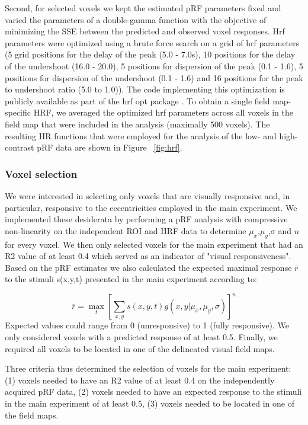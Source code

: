 Second, for selected voxels we kept the estimated pRF parameters fixed and varied the parameters of a double-gamma function with the objective of minimizing the SSE between the predicted and observed voxel responses. Hrf parameters were optimized using a brute force search on a grid of hrf parameters (5 grid positions for the delay of the peak (5.0 - 7.0s), 10 positions for the delay of the undershoot (16.0 - 20.0), 5 positions for dispersion of the peak (0.1 - 1.6), 5 positions for dispersion of the undershoot (0.1 - 1.6) and 16 positions for the peak to undershoot ratio (5.0 to 1.0)). The code implementing this optimization is publicly available as part of the hrf opt package \parencite{pyprf_motion}. To obtain a single field map-specific HRF, we averaged the optimized hrf parameters across all voxels in the field map that were included in the analysis (maximally 500 voxels). The resulting HR functions that were employed for the analysis of the low- and high-contrast pRF data are shown in Figure ~\ref{fig:hrf}.

\subsubsection{Voxel selection}
We were interested in selecting only voxels that are visually responsive and, in particular, responsive to the eccentricities employed in the main experiment. We implemented these desiderata by performing a pRF analysis with compressive non-linearity on the independent ROI and HRF data to determine $\mu_x$,$\mu_y$,$\sigma$ and $n$ for every voxel. We then only selected voxels for the main experiment that had an R2 value of at least 0.4 which served as an indicator of "visual responsiveness". Based on the pRF estimates we also calculated the expected maximal response $\overline{r}$ to the stimuli s(x,y,t) presented in the main experiment according to:

\begin{equation}
\overline{r} = \max_t [\sum_{x,y} s(x,y,t) g(x, y|\mu_x,\mu_y,\sigma)]^n
\end{equation}
Expected values could range from 0 (unresponsive) to 1 (fully responsive). We only considered voxels with a predicted response of at least 0.5. Finally, we required all voxels to be located in one of the delineated visual field maps.

Three criteria thus determined the selection of voxels for the main experiment: (1) voxels needed to have an R2 value of at least 0.4 on the independently acquired pRF data, (2) voxels needed to have an expected response to the stimuli in the main experiment of at least 0.5, (3) voxels needed to be located in one of the field maps.

